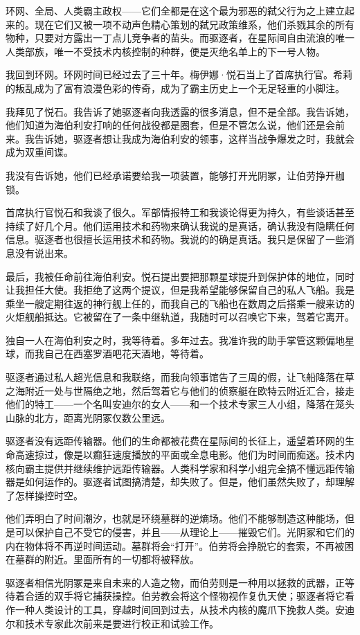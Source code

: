 \documentclass[
  b5paper, 
  10pt, 
  AutoFakeBold, 
  AutoFakeSlant
]{article}
\begin{document}
环网、全局、人类霸主政权——它们全都是在这个最为邪恶的弑父行为之上建立起来的。现在它们又被一项不动声色精心策划的弑兄政策维系，他们杀戮其余的所有物种，只要对方露出一丁点儿竞争者的苗头。而驱逐者，在星际间自由流浪的唯一人类部族，唯一不受技术内核控制的种群，便是灭绝名单上的下一号人物。

我回到环网。环网时间已经过去了三十年。梅伊娜·悦石当上了首席执行官。希莉的叛乱成为了富有浪漫色彩的传奇，成为了霸主历史上一个无足轻重的小脚注。

我拜见了悦石。我告诉了她驱逐者向我透露的很多消息，但不是全部。我告诉她，他们知道为海伯利安打响的任何战役都是圈套，但是不管怎么说，他们还是会前来。我告诉她，驱逐者想让我成为海伯利安的领事，这样当战争爆发之时，我就会成为双重间谍。

我没有告诉她，他们已经承诺要给我一项装置，能够打开光阴冢，让伯劳挣开枷锁。

首席执行官悦石和我谈了很久。军部情报特工和我谈论得更为持久，有些谈话甚至持续了好几个月。他们运用技术和药物来确认我说的是真话，确认我没有隐瞒任何信息。驱逐者也很擅长运用技术和药物。我说的的确是真话。我只是保留了一些消息没有说出来。

最后，我被任命前往海伯利安。悦石提出要把那颗星球提升到保护体的地位，同时让我担任大使。我拒绝了这两个提议，但是我希望能够保留自己的私人飞船。我是乘坐一艘定期往返的神行舰上任的，而我自己的飞船也在数周之后搭乘一艘来访的火炬舰船抵达。它被留在了一条中继轨道，我随时可以召唤它下来，驾着它离开。

独自一人在海伯利安之时，我等待着。多年过去。我准许我的助手掌管这颗偏地星球，而我自己在西塞罗酒吧花天酒地，等待着。

驱逐者通过私人超光信息和我联络，而我向领事馆告了三周的假，让飞船降落在草之海附近一处与世隔绝之地，然后驾着它与他们的侦察艇在欧特云附近汇合，接走他们的特工——一个名叫安迪尔的女人——和一个技术专家三人小组，降落在笼头山脉的北方，距离光阴冢仅数公里远。

驱逐者没有远距传输器。他们的生命都被花费在星际间的长征上，遥望着环网的生命高速掠过，像是以癫狂速度播放的平面或全息电影。他们为时间而痴迷。技术内核向霸主提供并继续维护远距传输器。人类科学家和科学小组完全搞不懂远距传输器是如何运作的。驱逐者试图搞清楚，却失败了。但是，他们虽然失败了，却理解了怎样操控时空。

他们弄明白了时间潮汐，也就是环绕墓群的逆熵场。他们不能够制造这种能场，但是可以保护自己不受它的侵害，并且——从理论上——摧毁它们。光阴冢和它们的内在物体将不再逆时间运动。墓群将会“打开”。伯劳将会挣脱它的套索，不再被困在墓群的附近。里面所有的一切都将被释放。

驱逐者相信光阴冢是来自未来的人造之物，而伯劳则是一种用以拯救的武器，正等待着合适的双手将它捕获操控。伯劳教会将这个怪物视作复仇天使；驱逐者将它看作一种人类设计的工具，穿越时间回到过去，从技术内核的魔爪下挽救人类。安迪尔和技术专家此次前来是要进行校正和试验工作。
\end{document}
